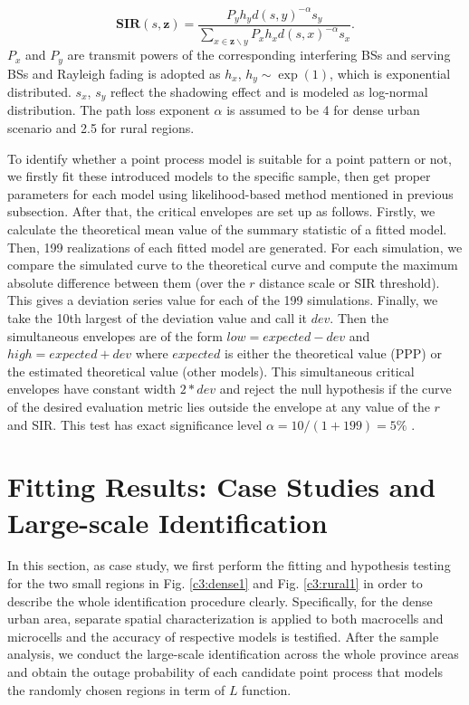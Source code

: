\begin{equation} \label{sinr}
\mathbf{SIR}(s, \mathbf{z})=\frac{P_yh_yd(s,y)^{-\alpha}s_y}{\sum_{x\in\mathbf{z}\backslash y}P_xh_xd(s,x)^{-\alpha}s_x}.
\end{equation}
$P_x$ and $P_y$ are transmit powers of the corresponding interfering BSs and serving BSs and Rayleigh fading is adopted as $h_x$, $h_y\sim\exp(1)$, which is exponential distributed. $s_x$, $s_y$ reflect the shadowing effect and is modeled as log-normal distribution. The path loss exponent $\alpha$ is assumed to be 4 for dense urban scenario and 2.5 for rural regions.

To identify whether a point process model is suitable for a point pattern or not, we firstly fit these introduced models to the specific sample, then get proper parameters for each model using likelihood-based method mentioned in previous subsection. After that, the critical envelopes are set up as follows. Firstly, we calculate the theoretical mean value of the summary statistic of a fitted model. Then, 199 realizations of each fitted model are generated. For each simulation, we compare the simulated curve to the theoretical curve and compute the maximum absolute difference between them (over the $r$ distance scale or SIR threshold). This gives a deviation series value for each of the 199 simulations. Finally, we take the 10th largest of the deviation value and call it $dev$. Then the simultaneous envelopes are of the form $low=expected-dev$ and $high=expected+dev$ where $expected$ is either the theoretical value (PPP) or the estimated theoretical value (other models). This simultaneous critical envelopes have constant width $2*dev$ and reject the null hypothesis if the curve of the desired evaluation metric lies outside the envelope at any value of the $r$ and SIR. This test has exact significance level $\alpha=10/(1+199)=5\%$ \cite{baddeley2005spatstat}.

\section{Fitting Results: Case Studies and Large-scale Identification} \label{sec3-5}
In this section, as case study, we first perform the fitting and hypothesis testing for the two small regions in Fig. \ref{c3:dense1} and Fig. \ref{c3:rural1} in order to describe the whole identification procedure clearly. Specifically, for the dense urban area, separate spatial characterization is applied to both macrocells and microcells and the accuracy of respective models is testified. After the sample analysis, we conduct the large-scale identification across the whole province areas and obtain the outage probability of each candidate point process that models the randomly chosen regions in term of $L$ function.
